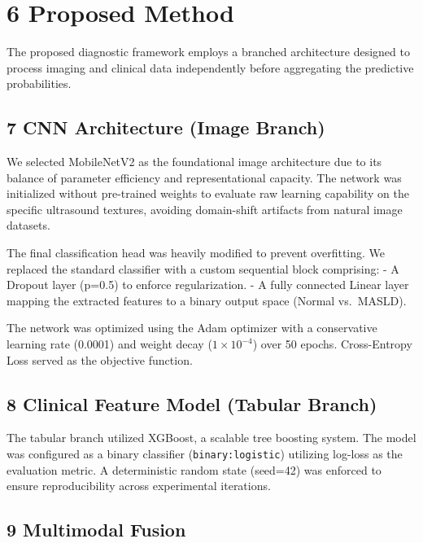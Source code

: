\section{6 Proposed Method}\label{proposed-method}

The proposed diagnostic framework employs a branched architecture
designed to process imaging and clinical data independently before
aggregating the predictive probabilities.

\subsection{7 CNN Architecture (Image
Branch)}\label{cnn-architecture-image-branch}

We selected MobileNetV2 as the foundational image architecture due to
its balance of parameter efficiency and representational capacity. The
network was initialized without pre-trained weights to evaluate raw
learning capability on the specific ultrasound textures, avoiding
domain-shift artifacts from natural image datasets.

The final classification head was heavily modified to prevent
overfitting. We replaced the standard classifier with a custom
sequential block comprising: - A Dropout layer (p=0.5) to enforce
regularization. - A fully connected Linear layer mapping the extracted
features to a binary output space (Normal vs.~MASLD).

The network was optimized using the Adam optimizer with a conservative
learning rate (0.0001) and weight decay (\(1 \times 10^{-4}\)) over 50
epochs. Cross-Entropy Loss served as the objective function.

\subsection{8 Clinical Feature Model (Tabular
Branch)}\label{clinical-feature-model-tabular-branch}

The tabular branch utilized XGBoost, a scalable tree boosting system.
The model was configured as a binary classifier
(\texttt{binary:logistic}) utilizing log-loss as the evaluation metric.
A deterministic random state (seed=42) was enforced to ensure
reproducibility across experimental iterations.

\subsection{9 Multimodal Fusion}\label{multimodal-fusion}


